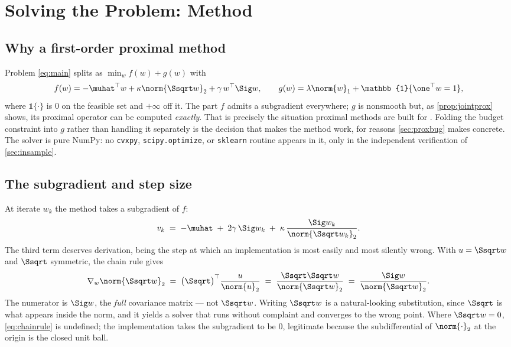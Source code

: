 \section{Solving the Problem: Method}\label{sec:method}

\subsection{Why a first-order proximal method}

Problem \cref{eq:main} splits as $\min_w f(w) + g(w)$ with
\begin{equation}\label{eq:split}
f(w) = -\muhat^\top w + \kappa\norm{\Ssqrt w}_2 + \gamma\, w^\top \Sig w,
\qquad
g(w) = \lambda\norm{w}_1 + \mathbb{1}\{\one^\top w = 1\},
\end{equation}
where $\mathbb{1}\{\cdot\}$ is $0$ on the feasible set and $+\infty$ off it. The part $f$
admits a subgradient everywhere; $g$ is nonsmooth but, as \cref{prop:jointprox} shows, its
proximal operator can be computed \emph{exactly}. That is precisely the situation proximal
methods are built for \citep{parikh2014}. Folding the budget constraint into $g$ rather than
handling it separately is the decision that makes the method work, for reasons
\cref{sec:proxbug} makes concrete. The solver is pure NumPy: no \texttt{cvxpy},
\texttt{scipy.optimize}, or \texttt{sklearn} routine appears in it, only in the independent
verification of \cref{sec:insample}.

\subsection{The subgradient and step size}

At iterate $w_k$ the method takes a subgradient of $f$:
\begin{equation}\label{eq:subgrad}
v_k \;=\; -\muhat \;+\; 2\gamma\,\Sig w_k
        \;+\; \kappa\,\frac{\Sig w_k}{\norm{\Ssqrt w_k}_2}.
\end{equation}
The third term deserves derivation, being the step at which an implementation is most easily
and most silently wrong. With $u = \Ssqrt w$ and $\Ssqrt$ symmetric, the chain rule gives
\begin{equation}\label{eq:chainrule}
\nabla_w \norm{\Ssqrt w}_2
  \;=\; \bigl(\Ssqrt\bigr)^\top \frac{u}{\norm{u}_2}
  \;=\; \frac{\Ssqrt \Ssqrt w}{\norm{\Ssqrt w}_2}
  \;=\; \frac{\Sig w}{\norm{\Ssqrt w}_2}.
\end{equation}
The numerator is $\Sig w$, the \emph{full} covariance matrix --- not $\Ssqrt w$. Writing
$\Ssqrt w$ is a natural-looking substitution, since $\Ssqrt$ is what appears inside the norm,
and it yields a solver that runs without complaint and converges to the wrong point. Where
$\Ssqrt w = 0$, \cref{eq:chainrule} is undefined; the implementation takes the subgradient to
be $0$, legitimate because the subdifferential of $\norm{\cdot}_2$ at the origin is the closed
unit ball.

